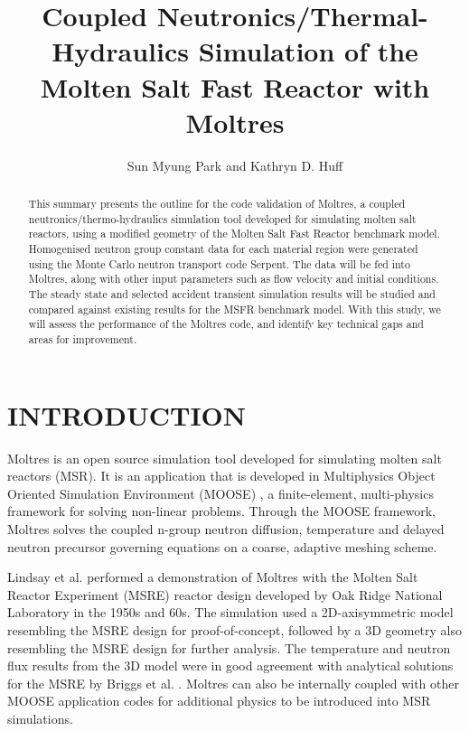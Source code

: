 \documentclass{anstrans}
\title{Coupled Neutronics/Thermal-Hydraulics Simulation of the Molten Salt Fast Reactor with Moltres}
\author{Sun Myung Park and Kathryn D. Huff}
\institute{Dept. of Nuclear, Plasma and Radiological Engineering, University of Illinois at Urbana-Champaign \\
smpark3@illinois.edu}
\begin{document}
\begin{abstract}
This summary presents the outline for the code validation of Moltres, a coupled neutronics/thermo-hydraulics simulation tool developed for simulating molten salt reactors, using a modified geometry of the Molten Salt Fast Reactor benchmark model. Homogenised neutron group constant data for each material region were generated using the Monte Carlo neutron transport code Serpent. The data will be fed into Moltres, along with other input parameters such as flow velocity and initial conditions. The steady state and selected accident transient simulation results will be studied and compared against existing results for the MSFR benchmark model. With this study, we will assess the performance of the Moltres code, and identify key technical gaps and areas for improvement.
\end{abstract}

\section{INTRODUCTION}

Moltres is an open source simulation tool developed for simulating molten salt reactors (MSR). It is an application that is developed in Multiphysics Object Oriented Simulation Environment (MOOSE) \cite{gaston_moose:_2009}, a finite-element, multi-physics framework for solving non-linear problems. Through the MOOSE framework, Moltres solves the coupled n-group neutron diffusion, temperature and delayed neutron precursor governing equations on a coarse, adaptive meshing scheme. 

Lindsay et al. \cite{lindsay_introduction_2018} performed a demonstration of Moltres with the Molten Salt Reactor Experiment (MSRE) reactor design developed by Oak Ridge National Laboratory in the 1950s and 60s. The simulation used a 2D-axisymmetric model resembling the MSRE design for proof-of-concept, followed by a 3D geometry also resembling the MSRE design for further analysis. The temperature and neutron flux results from the 3D model were in good agreement with analytical solutions for the MSRE by Briggs et al. \cite{briggs_molten-salt_1964}. Moltres can also be internally coupled with other MOOSE application codes for additional physics to be introduced into MSR simulations.

\end{document}
